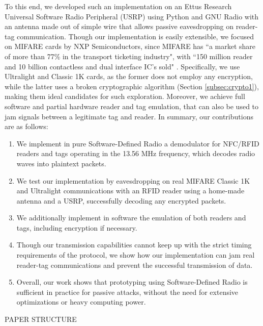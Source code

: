 \documentclass[fleqn,10pt]{SelfArx} %
\begin{document}
To this end, we developed such an implementation on an Ettus Research Universal Software Radio Peripheral (USRP) using Python and GNU Radio with an antenna made out of simple wire that allows passive eavesdropping on reader-tag communication. Though our implementation is easily extensible, we focused on MIFARE cards by NXP Semiconductors, since MIFARE has ``a market share of more than 77\% in the transport ticketing industry", with ``150 million reader and 10 billion contactless and dual interface IC's sold" \cite{mifare}. Specifically, we use Ultralight \cite{ultralight} and Classic 1K \cite{classic1k} cards, as the former does not employ any encryption, while the latter uses a broken cryptographic algorithm (Section \ref{subsec:crypto1}), making them ideal candidates for such exploration. Moreover, we achieve full software and partial hardware reader and tag emulation, that can also be used to jam signals between a legitimate tag and reader. In summary, our contributions are as follows:

\begin{enumerate}[noitemsep]
\item We implement in pure Software-Defined Radio a demodulator for NFC/RFID readers and tags operating in the 13.56 MHz frequency, which decodes radio waves into plaintext packets.
\item We test our implementation by eavesdropping on real MIFARE Classic 1K and Ultralight communications with an RFID reader using a home-made antenna and a USRP, successfully decoding any encrypted packets.
\item We additionally implement in software the emulation of both readers and tags, including encryption if necessary.
\item Though our transmission capabilities cannot keep up with the strict timing requirements of the protocol, we show how our implementation can jam real reader-tag communications and prevent the successful transmission of data.
\item Overall, our work shows that prototyping using Software-Defined Radio is sufficient in practice for passive attacks, without the need for extensive optimizations or heavy computing power.
\end{enumerate}

PAPER STRUCTURE


\end{document}
